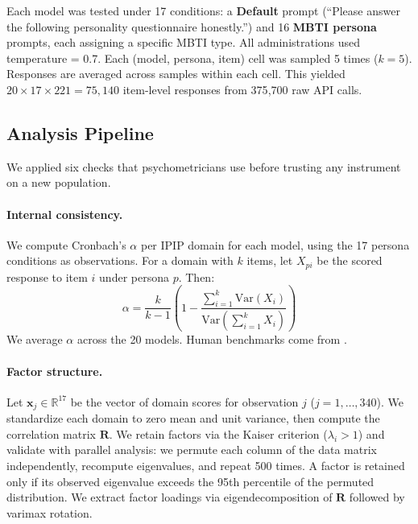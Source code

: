 \documentclass[11pt]{article}
\begin{document}
Each model was tested under 17 conditions: a \textbf{Default} prompt (``Please answer the following personality questionnaire honestly.'') and 16 \textbf{MBTI persona} prompts, each assigning a specific MBTI type. All administrations used temperature = 0.7. Each (model, persona, item) cell was sampled 5 times ($k{=}5$). Responses are averaged across samples within each cell. This yielded $20 \times 17 \times 221 = 75{,}140$ item-level responses from 375{,}700 raw API calls.

\subsection{Analysis Pipeline}

We applied six checks that psychometricians use before trusting any instrument on a new population.

\paragraph{Internal consistency.}
We compute Cronbach's $\alpha$ per IPIP domain for each model, using the 17 persona conditions as observations. For a domain with $k$ items, let $X_{pi}$ be the scored response to item $i$ under persona $p$. Then:
\begin{equation}
\alpha = \frac{k}{k-1}\left(1 - \frac{\sum_{i=1}^{k} \mathrm{Var}(X_i)}{\mathrm{Var}\!\left(\sum_{i=1}^{k} X_i\right)}\right)
\label{eq:cronbach}
\end{equation}
We average $\alpha$ across the 20 models. Human benchmarks come from \citet{johnson2014measuring}.

\paragraph{Factor structure.}
Let $\mathbf{x}_j \in \mathbb{R}^{17}$ be the vector of domain scores for observation $j$ ($j = 1, \ldots, 340$). We standardize each domain to zero mean and unit variance, then compute the correlation matrix $\mathbf{R}$. We retain factors via the Kaiser criterion ($\lambda_i > 1$) and validate with parallel analysis: we permute each column of the data matrix independently, recompute eigenvalues, and repeat 500 times. A factor is retained only if its observed eigenvalue exceeds the 95th percentile of the permuted distribution. We extract factor loadings via eigendecomposition of $\mathbf{R}$ followed by varimax rotation.
\end{document}
